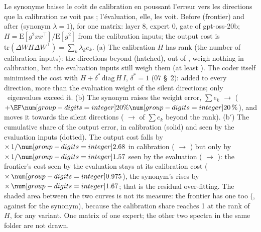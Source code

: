   {Le synonyme baisse le coût de calibration en poussant l'erreur vers les directions que la calibration ne voit
   pas ; l'évaluation, elle, les voit.}
  {Before (frontier) and after (synonym $\lambda=1$), for one matrix: layer 8, expert 0, gate of gpt-oss-20b;
   $H=\mathrm{E}[g^2xx^\top]/\mathrm{E}[g^2]$ from the calibration inputs; the output cost is
   $\mathrm{tr}(\Delta W H\Delta W^\top)=\sum_k\lambda_k e_k$. (a) The calibration $H$ has rank
   \CodonNum{\SynoNRang} (the number of calibration inputs): the
   \CodonNum{\the\numexpr\SynoNDirections-\SynoNRang\relax} directions beyond (hatched), out of
   \CodonNum{\SynoNDirections}, weigh nothing in calibration, but the evaluation inputs still weigh them (at least
   \CodonNum{\SynoNLambdaEvalMin}). The coder itself minimised the cost with $H+\delta^*\,\overline{\mathrm{diag}\,H}\,I$,
   $\delta^*=1$ (07 §~2): \CodonNum{\SynoNAmorti} added to every direction, more than the evaluation weight of the
   silent directions; only \SynoNAmortiDessus\ eigenvalues exceed it. (b) The synonym raises the weight error,
   $\sum e_k$ \CodonNum{\SynoNEnergieF} $\to$ \CodonNum{\SynoNEnergieS} ($+\Pourcent{\SynoNEnergieHausse}$), and
   moves it towards the silent directions (\Pourcent{\SynoNPartNulleF} $\to$ \Pourcent{\SynoNPartNulleS} of
   $\sum e_k$ beyond the rank). (b$'$) The cumulative share of the output error, in calibration (solid) and
   seen by the evaluation inputs (dotted). The output cost falls by $\times\,1/\CodonNum{\SynoNCalibRapport}$ in
   calibration (\CodonNum{\SynoNCalibF} $\to$ \CodonNum{\SynoNCalibS}) but only by
   $\times\,1/\CodonNum{\SynoNEvalRapport}$ seen by the evaluation (\CodonNum{\SynoNEvalF} $\to$ \CodonNum{\SynoNEvalS}):
   the frontier's cost seen by the evaluation stays at its calibration cost ($\times\,\CodonNum{\SynoNSurF}$), the
   synonym's rises by $\times\,\CodonNum{\SynoNSurS}$; that is the residual over-fitting. The shaded area between
   the two curves is not its measure: the frontier has one too (\CodonNum{\SynoNAireF}, against
   \CodonNum{\SynoNAireS} for the synonym), because the calibration share reaches 1 at the rank of $H$, for any
   variant. One matrix of one expert; the other two spectra in the same folder are not drawn.}
